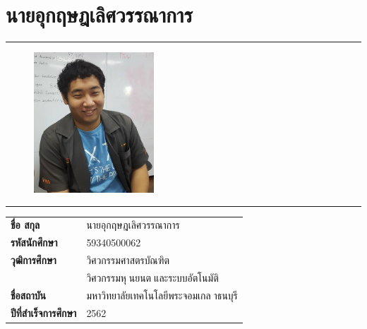 \section*{นายอุกฤษฎเลิศวรรณาการ}
\hrule height .7pt
\begin{figure}[!ht]
	\centering
	\includegraphics[width=0.4\textwidth]{pages/images/o.png}
\end{figure}
\hrule height .7pt
\raggedright
\begin{tabular}{p{} p{}}
    \textbf{ชื่อ สกุล} & {นายอุกฤษฎเลิศวรรณาการ} \\
    \textbf{รหัสนักศึกษา} & {59340500062}\\
    \textbf{วุฒิการศึกษา} & {วิศวกรรมศาสตรบัณฑิต} \\
    {} & {วิศวกรรมหุนยนตและระบบอัตโนมัติ}\\
    \textbf{ชื่อสถาบัน} & {มหาวิทยาลัยเทคโนโลยีพระจอมเกลาธนบุรี} \\
    \textbf{ปีที่สำเร็จการศึกษา} & {2562} \\
\end{tabular}   

